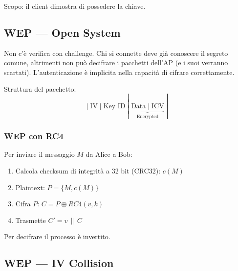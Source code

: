 Scopo: il client dimostra di possedere la chiave.


\subsection{WEP --- Open System}

Non c'\`e verifica con challenge. Chi si connette deve gi\`a conoscere il segreto comune, altrimenti non pu\`o decifrare i pacchetti dell'AP (e i suoi verranno scartati). L'autenticazione \`e implicita nella capacit\`a di cifrare correttamente.

Struttura del pacchetto:
\[
  |\;\text{IV}\;|\;\text{Key ID}\;|\;\underbrace{\text{Data}\;|\;\text{ICV}}_{\text{Encrypted}}\;|
\]

\subsubsection{WEP con RC4}


Per inviare il messaggio $M$ da Alice a Bob:
\begin{enumerate}
  \item Calcola checksum di integrit\`a a 32 bit (CRC32): $c(M)$
  \item Plaintext: $P = \{M, c(M)\}$
  \item Cifra $P$: $C = P \oplus RC4(v, k)$
  \item Trasmette $C' = v \,\|\, C$
\end{enumerate}
Per decifrare il processo \`e invertito.

\subsection{WEP --- IV Collision}


